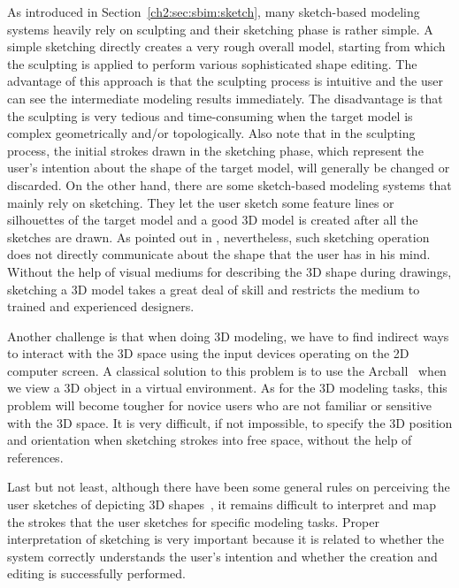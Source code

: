 As introduced in Section~\ref{ch2:sec:sbim:sketch},
many sketch-based modeling systems heavily rely on sculpting and
their sketching phase is rather simple. A simple sketching
directly creates a very rough overall model, starting from which the
sculpting is applied to perform various sophisticated shape editing.
The advantage of this approach is that the sculpting process is
intuitive and the user can see the intermediate modeling results
immediately. The disadvantage is that the sculpting is very tedious
and time-consuming when the target model is complex geometrically
and/or topologically. Also note that in the sculpting process, the
initial strokes drawn in the sketching phase, which represent the
user's intention about the shape of the target model, will generally
be changed or discarded. On the other hand, there are some
sketch-based modeling systems that mainly rely on
sketching. They let the user sketch some feature lines or silhouettes of
the target model and a good 3D model is created after all the sketches
are drawn. As pointed out in \cite{CIW08}, nevertheless, such sketching
operation does not directly communicate about the shape that the user
has in his mind. Without the help of visual mediums for describing the 3D shape
during drawings, sketching a 3D model takes a great deal of skill
and restricts the medium to trained and experienced designers.


Another challenge is that when doing 3D modeling, we have to find
indirect ways to interact with the 3D space using the input devices
operating on the 2D computer screen. A classical solution to this
problem is to use the Arcball~\cite{SK92} when we view a 3D object
in a virtual environment. As for the 3D modeling tasks, this problem
will become tougher for novice users who are not familiar or
sensitive with the 3D space. It is very difficult, if not
impossible, to specify the 3D position and orientation when
sketching strokes into free space, without the help of references.

Last but not least, although there have been  some general rules on
perceiving the user sketches of depicting 3D shapes~\cite{HD00}, it
remains difficult to interpret and map the strokes that the user
sketches for specific modeling tasks. Proper interpretation of
sketching is very important because it is related to whether the
system correctly understands the user's intention and whether the
creation and editing is successfully performed.

